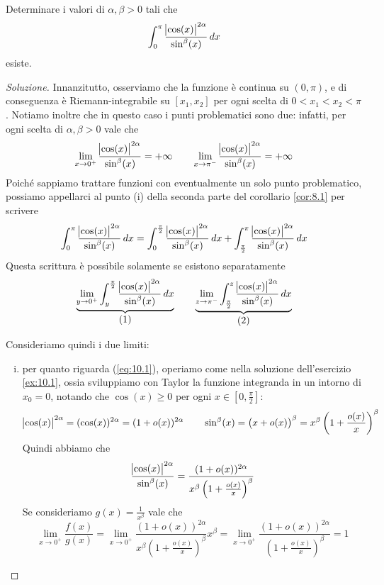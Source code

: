 \begin{exercise}
    \label{ex:10.2}
    Determinare i valori di $\alpha, \beta>0$ tali che
    \[
    \int_0^\pi \frac{\abs{\cos(x)}^{2\alpha}}{\sin^\beta(x)}\, dx
    \]
    esiste.
\end{exercise}
\begin{proof}[Soluzione]
    Innanzitutto, osserviamo che la funzione è continua su $(0,\pi)$, e di conseguenza è Riemann-integrabile su $[x_1, x_2]$ per ogni scelta di $0<x_1<x_2<\pi$. Notiamo inoltre che in questo caso i punti problematici sono due: infatti, per ogni scelta di $\alpha, \beta>0$ vale che
    \[
    \lim_{x\to 0^+}\frac{\abs{\cos(x)}^{2\alpha}}{\sin^\beta(x)} = +\infty \qquad \lim_{x\to \pi^-} \frac{\abs{\cos(x)}^{2\alpha}}{\sin^\beta(x)} = +\infty
    \]
    Poiché sappiamo trattare funzioni con eventualmente un solo punto problematico, possiamo appellarci al punto (i) della seconda parte del corollario \ref{cor:8.1} per scrivere
    \[
    \int_0^\pi \frac{\abs{\cos(x)}^{2\alpha}}{\sin^\beta(x)}\, dx = \int_0^{\frac{\pi}{2}}\frac{\abs{\cos(x)}^{2\alpha}}{\sin^\beta(x)}\, dx + \int_{\frac{\pi}{2}}^\pi \frac{\abs{\cos(x)}^{2\alpha}}{\sin^\beta(x)}\, dx
    \]
    Questa scrittura è possibile solamente se esistono separatamente
    \[
    \underbrace{\lim_{y\to 0^+} \int_y^{\frac{\pi}{2}} \frac{\abs{\cos(x)}^{2\alpha}}{\sin^\beta(x)}\, dx}_{\stepcounter{equation}\mbox{(\theequation)}} \qquad \underbrace{\lim_{z\to \pi^-}\int_{\frac{\pi}{2}}^z \frac{\abs{\cos(x)}^{2\alpha}}{\sin^\beta(x)}\, dx}_{\stepcounter{equation}\mbox{(\theequation)}}
    \]
    \addtocounter{equation}{-2}\label{eq:10.1}
    \addtocounter{equation}{0}\label{eq:10.2}
    Consideriamo quindi i due limiti:
    \begin{enumerate}[(i)]
        \item per quanto riguarda (\ref{eq:10.1}), operiamo come nella soluzione dell'esercizio \ref{ex:10.1}, ossia sviluppiamo con Taylor la funzione integranda in un intorno di $x_0=0$, notando che $\cos(x)\ge 0$ per ogni $x\in\left[0,\frac{\pi}{2}\right]$:
        \[
        \abs{\cos(x)}^{2\alpha} = (\cos(x))^{2\alpha} = (1+o(x))^{2\alpha} \qquad \sin^\beta(x) = \left(x + o(x)\right)^\beta = x^\beta\left(1+\frac{o(x)}{x}\right)^\beta
        \]
        Quindi abbiamo che
        \[
        \frac{\abs{\cos(x)}^{2\alpha}}{\sin^\beta(x)} = \frac{(1+o(x))^{2\alpha}}{x^\beta\left(1+\frac{o(x)}{x}\right)^\beta}
        \]
        Se consideriamo $g(x) = \frac{1}{x^\beta}$ vale che
        \[
        \lim_{x\to 0^+}\frac{f(x)}{g(x)} = \lim_{x\to 0^+} \frac{(1+o(x))^{2\alpha}}{x^\beta\left(1+\frac{o(x)}{x}\right)^\beta} x^\beta = \lim_{x\to 0^+} \frac{(1+o(x))^{2\alpha}}{\left(1+\frac{o(x)}{x}\right)^\beta} = 1
\]
\end{enumerate}
\end{proof}
